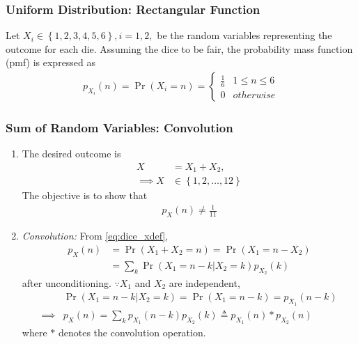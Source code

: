 \documentclass{beamer}
\providecommand{\pr}[1]{\ensuremath{\Pr\left(#1\right)}}
\providecommand{\cbrak}[1]{\ensuremath{\left\{#1\right\}}}
\theoremstyle{remark}
\numberwithin{equation}{section}
\begin{document}
\begin{frame}
\frametitle
	{Uniform Distribution: Rectangular Function}
		Let $X_i \in \cbrak{1,2,3,4,5,6}, i = 1,2,$ be the random variables representing the outcome for each die.  Assuming the dice to be fair, the probability mass function (pmf) is expressed as 
\begin{align}
\label{eq:dice_pmf_xi}
p_{X_i}(n) = \pr{X_i = n} = 
\begin{cases}
\frac{1}{6} & 1 \le n \le 6
\\
0 & otherwise
\end{cases}
\end{align}
\end{frame}
\begin{frame}
\frametitle{Sum of Random Variables: Convolution}
\begin{enumerate}[label=\thesection.\arabic*.,ref=\thesection.\theenumi]
	\item The desired outcome is
\begin{align}
\label{eq:dice_xdef}
X &= X_1 + X_2,
\\
\implies X &\in \cbrak{1,2,\dots,12}
\end{align}
%
The objective is to show that
\begin{align}
p_X(n) \ne \frac{1}{11}
\label{eq:dice_wrong}
\end{align}
\item {\em Convolution: }
From \eqref{eq:dice_xdef},
\begin{align}
p_X(n) &= \pr{X_1 + X_2 = n} = \pr{X_1  = n -X_2}
\\
&= \sum_{k}^{}\pr{X_1  = n -k | X_2 = k}p_{X_2}(k)
\label{eq:dice_x_sum}
\end{align}
after unconditioning.  $\because X_1$ and $X_2$ are independent,
\begin{align}
&\pr{X_1  = n -k | X_2 = k} 
	= \pr{X_1  = n -k} = p_{X_1}(n-k)
\nonumber \\
\implies
	&p_X(n) = \sum_{k}^{}p_{X_1}(n-k)p_{X_2}(k) \triangleq p_{X_1}(n)*p_{X_2}(n)
\label{eq:dice_x_conv}
\end{align}
where $*$ denotes the convolution operation. 
\end{enumerate}
\end{frame}
\end{document}
